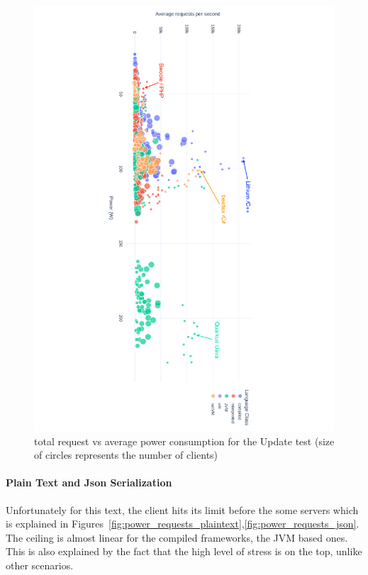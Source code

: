 \begin{figure}[hbt]
    \caption{total request vs average power consumption for the Update test (size of circles represents the number of clients) }
    \label{fig:power_requests_update}
    \includegraphics[width=
        \columnwidth,angle=9
        0]{imgs/power_requests_update}

\end{figure}

\paragraph{Plain Text and Json Serialization}
Unfortunately for this text, the client hits its limit before the some servers which is explained in Figures~\ref{fig:power_requests_plaintext},\ref{fig:power_requests_json}. The ceiling is almost linear for the compiled frameworks, the JVM based ones. This is also explained by the fact that the high level of stress is on the top, unlike other scenarios.


